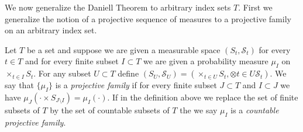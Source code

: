 We now generalize the Daniell Theorem to arbitrary index sets $T$.
First we generalize the notion of a projective sequence of measures to
a projective family on an arbitrary index set.
\begin{defn}Let $T$ be a set and suppose we are given a measurable
  space $(S_t, \mathcal{S}_t)$ for every $t \in T$ and for every
  finite subset $I \subset T$ we are given a probability measure
  $\mu_I$ on $\times_{t \in I} S_t$.  For any subset $U \subset T$
  define $(S_U, \mathcal{S}_U) = (\times_{t \in U} S_t , \otimes{t \in
    U} \mathcal{S}_t)$.  We say that $\lbrace \mu_I
  \rbrace$ is a \emph{projective family} if for every
  finite subset $J \subset T$ and $I \subset J$ we have $\mu_J( \cdot
  \times S_{J \setminus I}) = \mu_I( \cdot)$. If in the definition
  above we replace the set of finite subsets of $T$ by the set of
  countable subsets of $T$ the we say $\mu_I$ is a \emph{countable projective family}.
\end{defn}

